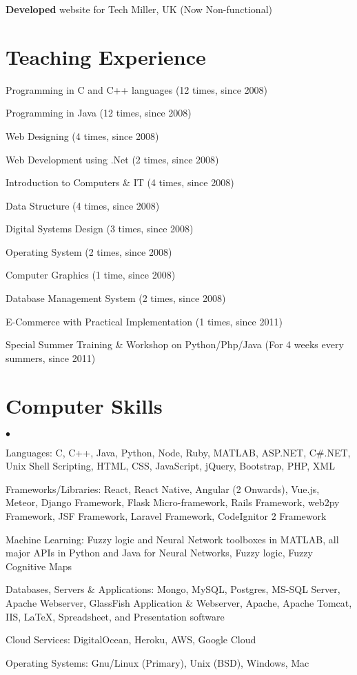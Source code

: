 \documentclass[margin,line]{res}
\newenvironment{list2}{
  \begin{list}{$\bullet$}{%
      \setlength{\itemsep}{0in}
      \setlength{\parsep}{0in} \setlength{\parskip}{0in}
      \setlength{\topsep}{0in} \setlength{\partopsep}{0in}
      \setlength{\leftmargin}{0.2in}}}{\end{list}}
\begin{document}
\begin{resume}
\textbf{Developed} website for Tech Miller, UK (Now Non-functional)

\section{\sc Teaching Experience}

Programming in C and C++ languages (12 times, since 2008)

Programming in Java (12 times, since 2008)

Web Designing (4 times, since 2008)

Web Development using .Net (2 times, since 2008)

Introduction to Computers \& IT (4 times, since 2008)

Data Structure (4 times, since 2008)

Digital Systems Design (3 times, since 2008)

Operating System (2 times, since 2008)

Computer Graphics (1 time, since 2008)

Database Management System (2 times, since 2008)

E-Commerce with Practical Implementation (1 times, since 2011)

Special Summer Training \& Workshop on Python/Php/Java (For 4 weeks every summers, since 2011)

\section{\sc Computer Skills}
\begin{list2}
\item Languages:  C, C++, Java, Python, Node, Ruby, MATLAB, ASP.NET, C\#.NET, Unix Shell Scripting, HTML, CSS, JavaScript, jQuery, Bootstrap, PHP, XML\\
\item Frameworks/Libraries: React, React Native, Angular (2 Onwards), Vue.js, Meteor, Django Framework, Flask Micro-framework, Rails Framework, web2py Framework, JSF Framework, Laravel Framework, CodeIgnitor 2 Framework
\item Machine Learning: Fuzzy logic and Neural Network toolboxes in MATLAB, all major APIs in Python and Java for Neural Networks, Fuzzy logic, Fuzzy Cognitive Maps  
\item Databases, Servers \& Applications: Mongo, MySQL, Postgres, MS-SQL Server, Apache Webserver, GlassFish Application \& Webserver, Apache, Apache Tomcat, IIS, \LaTeX, Spreadsheet, and Presentation software\\
\item Cloud Services: DigitalOcean, Heroku, AWS, Google Cloud
\item Operating Systems:  Gnu/Linux (Primary), Unix (BSD), Windows, Mac\\
\end{list2}


\end{resume}
\end{document}
